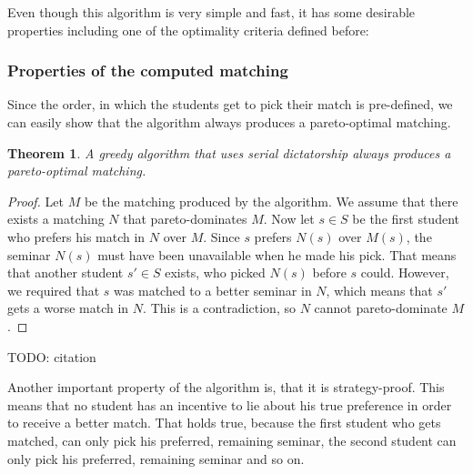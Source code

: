 Even though this algorithm is very simple and fast, it has some desirable properties including one of the optimality criteria defined before:

\subsubsection{Properties of the computed matching}
Since the order, in which the students get to pick their match is pre-defined, we can easily show that the algorithm always produces a pareto-optimal matching.
\newtheorem{theorem}{Theorem}
\begin{theorem}
    A greedy algorithm that uses serial dictatorship always produces a pareto-optimal matching.
\end{theorem}
\begin{proof}
    Let $M$ be the matching produced by the algorithm. We assume that there exists a matching $N$ that pareto-dominates $M$. Now let $s\in S$ be the first student who prefers his match in $N$ over $M$. Since $s$ prefers $N(s)$ over $M(s)$, the seminar $N(s)$ must have been unavailable when he made his pick. That means that another student $s' \in S$ exists, who picked $N(s)$ before $s$ could. However, we required that $s$ was matched to a better seminar in $N$, which means that $s'$ gets a worse match in $N$. This is a contradiction, so $N$ cannot pareto-dominate $M$.
\end{proof} TODO: citation

Another important property of the algorithm is, that it is strategy-proof. This means that no student has an incentive to lie about his true preference in order to receive a better match. That holds true, because the first student who gets matched, can only pick his preferred, remaining seminar, the second student can only pick his preferred, remaining seminar and so on.

